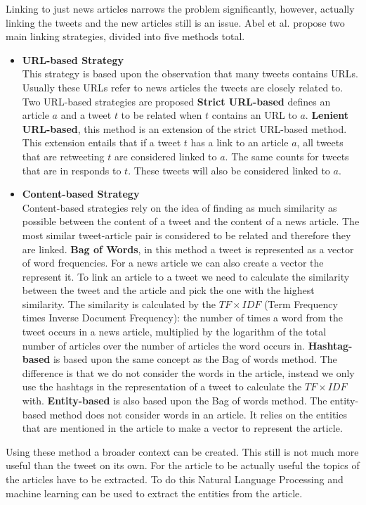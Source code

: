 \documentclass{article}
\begin{document}
Linking to just news articles narrows the problem significantly, however, actually linking the tweets and the new articles still is an issue. Abel et al. propose two main linking strategies, divided into five methods total.
\begin{itemize}
\item \textbf{URL-based Strategy}\\
This strategy is based upon the observation that many tweets contains URLs. Usually these URLs refer to news articles the tweets are closely related to. Two URL-based strategies are proposed
	\subitem \textbf{Strict URL-based} defines an article $a$ and a tweet $t$ to be related when $t$ contains an URL to $a$.
	\subitem \textbf{Lenient URL-based}, this method is an extension of the strict URL-based method. This extension entails that if a tweet $t$ has a link to an article $a$, all tweets that are retweeting $t$ are considered linked to $a$. The same counts for tweets that are in responds to $t$. These tweets will also be considered linked to $a$.
\item \textbf{Content-based Strategy}\\
Content-based strategies rely on the idea of finding as much similarity as possible between the content of a tweet and the content of a news article. The most similar tweet-article pair is considered to be related and therefore they are linked.
	\subitem \textbf{Bag of Words}, in this method a tweet is represented as a vector of word frequencies. For a news article we can also create a vector the represent it. To link an article to a tweet we need to calculate the similarity between the tweet and the article and pick the one with the highest similarity. The similarity is calculated by the $TF \times IDF$ (Term Frequency times Inverse Document Frequency): the number of times a word from the tweet occurs in a news article, multiplied by the logarithm of the total number of articles over the number of articles the word occurs in. \cite{tfidf}
	\subitem \textbf{Hashtag-based} is based upon the same concept as the Bag of words method. The difference is that we do not consider the words in the article, instead we only use the hashtags in the representation of a tweet to calculate the $TF \times IDF$ with.
	\subitem \textbf{Entity-based} is also based upon the Bag of words method. The entity-based method does not consider words in an article. It relies on the entities that are mentioned in the article to make a vector to represent the article. 
\end{itemize}
Using these method a broader context can be created. This still is not much more useful than the tweet on its own. For the article to be actually useful the topics of the articles have to be extracted. To do this Natural Language Processing and machine learning can be used to extract the entities from the article.  
\end{document}
